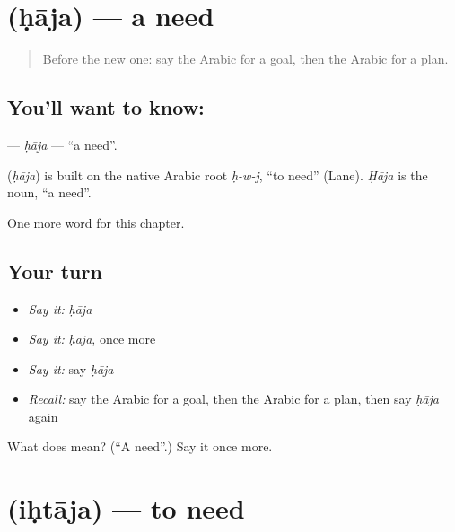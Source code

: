 \section[\texorpdfstring{\ar{حاجة} (ḥāja)}{حاجة (ḥāja)}]{ (ḥāja) — a need}

\label{lesson:AR-C114-haja}



\begin{quote}
Before the new one: say the Arabic for a goal, then the Arabic for a plan.
\end{quote}

\subsection*{You'll want to know: }
\textbf{} — \emph{ḥāja} — \textquotedblleft{}a need\textquotedblright{}.

\begin{cousinweb}
\textbf{} (\emph{ḥāja}) is built on the native Arabic root \emph{ḥ-w-j}, \textquotedblleft{}to need\textquotedblright{} (Lane). \emph{Ḥāja} is the noun, \textquotedblleft{}a need\textquotedblright{}.
\end{cousinweb}

\begin{grammarlens}[title={What you've built}]
One more word for this chapter.
\end{grammarlens}

\subsection*{Your turn}
\begin{itemize}
\raggedright
  \item \emph{Say it:} \emph{ḥāja}
  \item \emph{Say it:} \emph{ḥāja}, once more
  \item \emph{Say it:} say \emph{ḥāja}
  \item \emph{Recall:} say the Arabic for a goal, then the Arabic for a plan, then say \emph{ḥāja} again
\end{itemize}

\begin{tcolorbox}[breakable,colback=teal!4,colframe=teal!35!black,title={Before you move on}]
What does  mean? (\textquotedblleft{}A need\textquotedblright{}.) Say it once more.
\end{tcolorbox}
\section[\texorpdfstring{\ar{احتاج} (iḥtāja)}{احتاج (iḥtāja)}]{ (iḥtāja) — to need}

